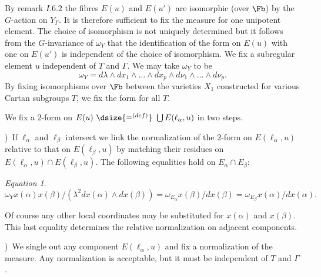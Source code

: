 \documentclass{memo-l}
\theoremstyle{definition}
\theoremstyle{remark}
\newtheorem{eqn}[theorem]{Equation}
\numberwithin{section}{chapter}
\numberwithin{equation}{chapter}
\begin{document}
   By remark $I.6.2$ the fibres $E(u)$ and $E(u')$ are isomorphic (over
$\Fb$) by the $G$-action on $Y_{{\Gamma}}$.  It is therefore sufficient
to fix the measure for one unipotent element.  The choice of isomorphism is
not uniquely determined but it follows from the $G$-invariance of
${\omega}_{Y}$ that the identification of the form on $E(u)$ with one on
$E(u')$ is independent of the choice of isomorphism.  We fix a subregular
element $u$ independent of $T$ and ${\Gamma}$.  We may take ${\omega}_{Y}$
to be
$$
{\omega}_{Y}  =  d{\lambda}\wedge dx_{1}\wedge \ldots \wedge dx_{p}\wedge
d{\nu}_{1}\wedge \ldots \wedge d{\nu}_{p}.
$$
By fixing isomorphisms over $\Fb$ between the varieties $X_{1}$
constructed for various Cartan subgroups $T$, we fix the form for all $T$.


   We fix a $2$-form on $E(u)\ {\dsize{\mathrel{\mathop=^{(def)}}}}\
\bigcup E({\ell}_{{\alpha}},u)$ in two steps.

\medskip
{})\ If ${\ell}_{{\alpha}}$ and ${\ell}_{{\beta}}$ intersect we link the
normalization of the $2$-form on $E({\ell}_{{\alpha}},u)$ relative to that
on $E({\ell}_{{\beta}},u)$ by matching their residues on
$E({\ell}_{{\alpha}},u) \cap E({\ell}_{{\beta}},u)$.  The following
equalities hold on $E_{{\alpha}} \cap E_{{\beta}}$:

\begin{eqn} %
$$
{\omega}_{Y}x({\alpha})x({\beta})/({\lambda}^{2}dx({\alpha})\wedge
dx({\beta}))  =  {\omega}_{E_\alpha} x({\beta})/dx({\beta})  =
{\omega}_{E_\beta} x({\alpha})/dx({\alpha}) .
$$
\end{eqn}

\noindent Of course any other local coordinates may be substituted for $x({\alpha})$
and $x({\beta})$.  This last equality determines the relative normalization
on adjacent components.

\medskip
{})\ We single out any component $E({\ell}_{{\alpha}},u)$ and fix a
normalization of the measure.  Any normalization is acceptable, but it must
be independent of $T$ and ${\Gamma}$.
\end{document}
